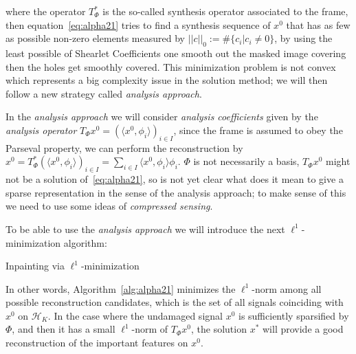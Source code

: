 where the operator $T^*_{\Phi}$ is the so-called synthesis operator associated to the frame, then equation~\ref{eq:alpha21} tries to find a synthesis sequence of $x^0$ that has as few as possible non-zero elements measured by $||c||_0:=\#\{c_i|c_i\neq 0\}$, by using the least possible of Shearlet Coefficients one smooth out the masked image covering then the holes get smoothly covered. This minimization problem is not convex which represents a big complexity issue in the solution method; we will then follow a new strategy called \textit{analysis approach}.

\bigskip

In the \textit{analysis approach} we will consider \textit{analysis coefficients} given by the \textit{analysis operator} $T_{\Phi}x^0=(\langle x^0,\phi_i\rangle)_{i\in I}$, since the frame is assumed to obey the Parseval property, we can perform the reconstruction by $x^0=T^*_{\Phi}(\langle x^0,\phi_i\rangle)_{i\in I}=\sum_{i\in I}\langle x^0,\phi_i\rangle\phi_i$. $\Phi$ is not necessarily a basis, $T_{\Phi}x^0$ might not be a solution of~\ref{eq:alpha21}, so is not yet clear what does it mean to give a sparse representation in the sense of the analysis approach; to make sense of this we need to use some ideas of \textit{compressed sensing}.

\bigskip

To be able to use the \textit{analysis approach} we will introduce the next $\ell^1$-minimization algorithm:

\bigskip

\begin{algorithm}[h!]

    \caption{Inpainting via $\ell^1$-minimization}
		\label{alg:alpha21}
\end{algorithm}

\bigskip

In other words, Algorithm~\ref{alg:alpha21} minimizes the $\ell^1$-norm among all possible reconstruction candidates, which is the set of all signals coinciding with $x^0$ on $\mathcal{H}_K$. In the case where the undamaged signal $x^0$ is sufficiently sparsified by $\Phi$, and then it has a small $\ell^1$-norm of $T_{\Phi}x^0$, the solution $x^*$ will provide a good reconstruction of the important features on $x^0$.

